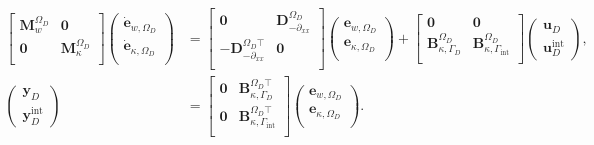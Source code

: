 \begin{tcolorbox}[colframe=blue,title=Subdomain $\Omega_D$,  coltitle=white]%
	\begin{equation}\label{eq:pHfindim_EB_OmD}
	\begin{aligned}
	\begin{bmatrix}
	\mathbf{M}_{w}^{\Omega_D} & \mathbf{0}\\
	\mathbf{0} & \mathbf{M}_{\kappa}^{\Omega_D}\\
	\end{bmatrix}
	\begin{pmatrix}
	\dot{\mathbf{e}}_{w, \Omega_D}\\
	\dot{\mathbf{e}}_{\kappa, \Omega_D}\\
	\end{pmatrix}
	&= \begin{bmatrix}
	\mathbf{0} & \mathbf{D}_{-\partial_{xx}}^{\Omega_D}\\
	-\mathbf{D}_{-\partial_{xx}}^{\Omega_D \top} & \mathbf{0}  \\
	\end{bmatrix}
	\begin{pmatrix}
	{\mathbf{e}}_{w, \Omega_D}\\
	{\mathbf{e}}_{\kappa, \Omega_D}\\
	\end{pmatrix} + \begin{bmatrix}
	\mathbf{0} & \mathbf{0} \\
	\mathbf{B}_{\kappa, \Gamma_D}^{\Omega_D} & \mathbf{B}_{\kappa, \Gamma_{\text{int}}}^{\Omega_D} \\
	\end{bmatrix} \begin{pmatrix}
	\mathbf{u}_D \\ \mathbf{u}_D^{\text{int}}
	\end{pmatrix}, \\
	\begin{pmatrix}
	\mathbf{y}_D \\ \mathbf{y}_D^{\text{int}}
	\end{pmatrix}  &=
	\begin{bmatrix}
	\mathbf{0} & \mathbf{B}_{\kappa, \Gamma_D}^{\Omega_D \top }\\ 
	\mathbf{0} & \mathbf{B}_{\kappa, \Gamma_{\text{int}}}^{\Omega_D \top}\\ 
	\end{bmatrix}
	\begin{pmatrix}
	{\mathbf{e}}_{w, \Omega_D}\\
	{\mathbf{e}}_{\kappa, \Omega_D}\\
	\end{pmatrix}.
	\end{aligned}
	\end{equation}
\end{tcolorbox} 
